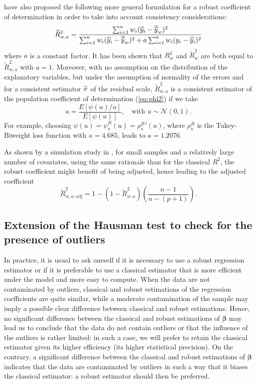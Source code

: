 \citet{Renaud:VictoriaFeser:2010} have also proposed the following more
general formulation for a robust coefficient of determination in order to take
into account consistency considerations:
%
\begin{equation}
    \label{eq:Rtilde2_w_a}
    \widetilde{R}_{w,a}^2 = \frac{\sum_{i=1}^{n} w_i (\widehat{y}_i - \overline{\widehat{y}}_w)^2}
    {\sum_{i=1}^{n} w_i (\widehat{y}_i - \overline{\widehat{y}}_w)^2 + 
    a\sum_{i=1}^{n} w_i (y_i - \widehat{y}_i)^2}
\end{equation}
%
where $a$ is a constant factor. It has been shown that $R_w^2$ and
$\widetilde{R}_w^2$ are both equal to $\widetilde{R}_{w,a}^2$ with
$a=1$. Moreover, with no assumption on the distribution of the explanatory
variables, but under the assumption of normality of the errors and for a
consistent estimator $\widehat{\sigma}$ of the residual scale, $\widetilde{R}_{w,a}^2$ 
is a consistent estimator of the population coefficient of
determination (\ref{eq:phi2}) if we take
\[
    a = \frac{E[\psi(u)/u]}{E[\psi(u)]},
    \quad\text{with $u \sim \mathcal{N}(0,1)$}.
\]
For example, choosing $\psi(u) = \psi_{\kappa}^B(u) = \rho_{\kappa}^{B}{'}(u)$,
where $\rho_{\kappa}^B$ is the Tukey-Biweight loss function with
$\kappa=4.685$, leads to $a=1.2076$.

As shown by a simulation study in \citet{Renaud:VictoriaFeser:2010}, for
small samples and a relatively large number of covariates, using the same
rationale than for the classical $R^2$, the robust coefficient might benefit
of being adjusted, hence leading to the adjusted coefficient
%
\begin{equation}
    \label{eq:Rtilde2_w_a_adj}
    \widetilde{R}_{w,a;\mathrm{adj}}^2 = 1 - \left(1 - \widetilde{R}_{w,a}^2\right) 
    \left(\frac{n-1}{n - (p+1)}\right).
\end{equation}


\subsection{Extension of the Hausman test to check for the presence of outliers}
\label{subsec:Hausman}

In practice, it is usual to ask oneself if it is necessary to use a robust
regression estimator or if it is preferable to use a classical estimator that
is more efficient under the model and more easy to compute. When the data are
not contaminated by outliers, classical and robust estimations of the
regression coefficients are quite similar, while a moderate contamination of
the sample may imply a possible clear difference between classical and robust
estimations. Hence, no significant difference between the classical and robust
estimations of $\boldsymbol\beta$ may lead us to conclude that the data do
not contain outliers or that the influence of the outliers is rather limited:
in such a case, we will prefer to retain the classical estimator given its
higher efficiency (its higher statistical precision). On the contrary, a
significant difference between the classical and robust estimations of
$\boldsymbol\beta$ indicates that the data are contaminated by outliers in
such a way that it biases the classical estimator: a robust estimator should
then be preferred.


